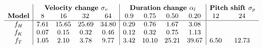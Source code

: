 \[\begin{array}{c|cccc|cccc|cc}
      & \multicolumn{4}{c|}{\textbf{Velocity change }\sigma_v} & \multicolumn{4}{c|}{\textbf{Duration change }\alpha_l} & \multicolumn{2}{c}{\textbf{Pitch shift }\sigma_p}\\
      \textbf{Model} & 8    & 16   & 32   & 64   & 0.9  & 0.75  & 0.50  & 0.20  & 12   & 24    \\ \hline
      f_H & 7.61 & 15.65 & 25.69 & 34.80 & 0.29 & 0.76 & 1.67 & 3.08 & \multicolumn{2}{c}{} \\
      f_K & 0.07 & 0.15 & 0.32 & 0.46 & 0.12 & 0.32 & 0.75 & 1.13 & \multicolumn{2}{c}{} \\
      f_T & 1.05 & 2.10 & 3.78 & 9.77 & 3.42 & 10.10 & 25.21 & 39.67 & 6.50 & 12.73
\end{array}\]

